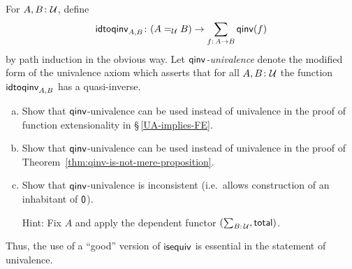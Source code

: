 \begin{exr}
    For\/ $A,B\colon\univ$, define
    \[
        \fun{idtoqinv}_{A,B}\colon(A\eq\univ B)
            \to
            \sum_{f\colon A\to B}\fun{qinv}(f)
    \]
    by path induction in the obvious way. Let \textsl{$\mathsf{qinv}$-univalence} denote the modified form of the univalence axiom which asserts that for all\/ $A,B\colon\univ$ the function\/ $\mathsf{idtoqinv}_{A,B}$ has a quasi-inverse.
    \begin{enumerate}[a),font=\upshape]
        \item Show that\/ $\mathsf{qinv}$-univalence can be used instead of univalence in the proof of function extensionality in\/ {\upshape\S\,\ref{UA-implies-FE}}.
        
        \item Show that\/ $\mathsf{qinv}$-univalence can be used instead of univalence in the proof of\/ {\upshape Theorem~\ref{thm:qinv-is-not-mere-proposition}}.
        
        \item Show that\/ $\mathsf{qinv}$-univalence is inconsistent (i.e.\ allows construction of an inhabitant of\/ $\mathsf{0}$).

       {\upshape Hint: Fix $A$ and apply the dependent functor $(\sum_{B\colon\univ},\fun{total})$.}
    \end{enumerate}
    Thus, the use of a ``good'' version of\/ $\mathsf{isequiv}$ is essential in the statement of univalence.
\end{exr}

